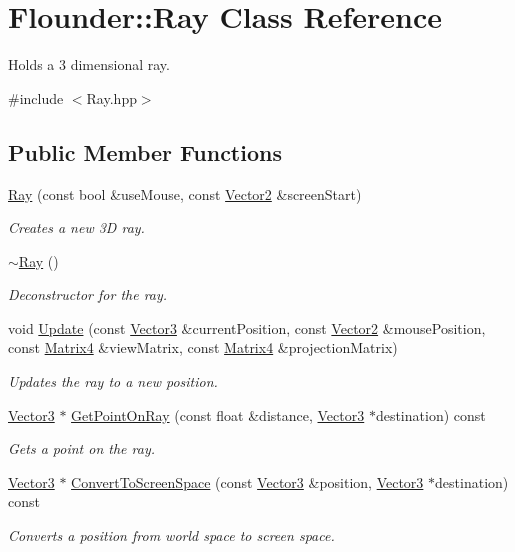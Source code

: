 \hypertarget{class_flounder_1_1_ray}{}\section{Flounder\+:\+:Ray Class Reference}
\label{class_flounder_1_1_ray}


Holds a 3 dimensional ray.  




{\ttfamily \#include $<$Ray.\+hpp$>$}

\subsection*{Public Member Functions}
\begin{DoxyCompactItemize}
\item 
\hyperlink{class_flounder_1_1_ray_a4fc171269225a312d092908a9e252bd1}{Ray} (const bool \&use\+Mouse, const \hyperlink{class_flounder_1_1_vector2}{Vector2} \&screen\+Start)
\begin{DoxyCompactList}\small\item\em Creates a new 3D ray. \end{DoxyCompactList}\item 
\hyperlink{class_flounder_1_1_ray_a69de562de29c5ebf855ba28c69fc67b9}{$\sim$\+Ray} ()
\begin{DoxyCompactList}\small\item\em Deconstructor for the ray. \end{DoxyCompactList}\item 
void \hyperlink{class_flounder_1_1_ray_a5f7210319f7a88bc1e7746fb81b8dfb0}{Update} (const \hyperlink{class_flounder_1_1_vector3}{Vector3} \&current\+Position, const \hyperlink{class_flounder_1_1_vector2}{Vector2} \&mouse\+Position, const \hyperlink{class_flounder_1_1_matrix4}{Matrix4} \&view\+Matrix, const \hyperlink{class_flounder_1_1_matrix4}{Matrix4} \&projection\+Matrix)
\begin{DoxyCompactList}\small\item\em Updates the ray to a new position. \end{DoxyCompactList}\item 
\hyperlink{class_flounder_1_1_vector3}{Vector3} $\ast$ \hyperlink{class_flounder_1_1_ray_aa20b681d89218eda9f964ae78552f7b7}{Get\+Point\+On\+Ray} (const float \&distance, \hyperlink{class_flounder_1_1_vector3}{Vector3} $\ast$destination) const
\begin{DoxyCompactList}\small\item\em Gets a point on the ray. \end{DoxyCompactList}\item 
\hyperlink{class_flounder_1_1_vector3}{Vector3} $\ast$ \hyperlink{class_flounder_1_1_ray_ad71167fffb1b81e150c886bf4da36285}{Convert\+To\+Screen\+Space} (const \hyperlink{class_flounder_1_1_vector3}{Vector3} \&position, \hyperlink{class_flounder_1_1_vector3}{Vector3} $\ast$destination) const
\begin{DoxyCompactList}\small\item\em Converts a position from world space to screen space. \end{DoxyCompactList}\end{DoxyCompactItemize}
